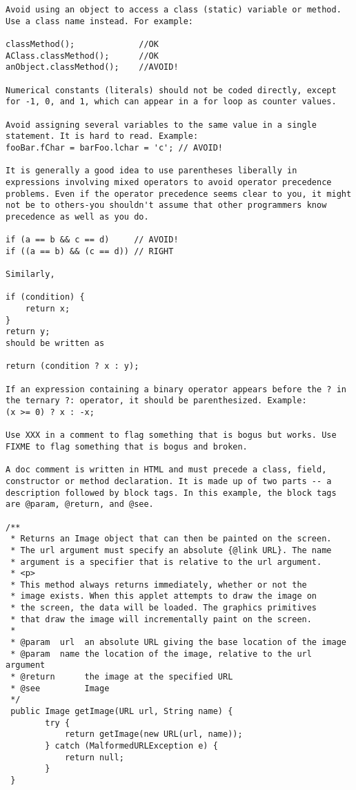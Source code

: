 \begin{lstlisting}
Avoid using an object to access a class (static) variable or method. Use a class name instead. For example:

classMethod();             //OK
AClass.classMethod();      //OK
anObject.classMethod();    //AVOID!

Numerical constants (literals) should not be coded directly, except for -1, 0, and 1, which can appear in a for loop as counter values.

Avoid assigning several variables to the same value in a single statement. It is hard to read. Example:
fooBar.fChar = barFoo.lchar = 'c'; // AVOID!

It is generally a good idea to use parentheses liberally in expressions involving mixed operators to avoid operator precedence problems. Even if the operator precedence seems clear to you, it might not be to others-you shouldn't assume that other programmers know precedence as well as you do.

if (a == b && c == d)     // AVOID!
if ((a == b) && (c == d)) // RIGHT

Similarly,

if (condition) {
    return x;
}
return y;
should be written as

return (condition ? x : y);

If an expression containing a binary operator appears before the ? in the ternary ?: operator, it should be parenthesized. Example:
(x >= 0) ? x : -x;

Use XXX in a comment to flag something that is bogus but works. Use FIXME to flag something that is bogus and broken.

A doc comment is written in HTML and must precede a class, field, constructor or method declaration. It is made up of two parts -- a description followed by block tags. In this example, the block tags are @param, @return, and @see.

/**
 * Returns an Image object that can then be painted on the screen. 
 * The url argument must specify an absolute {@link URL}. The name
 * argument is a specifier that is relative to the url argument. 
 * <p>
 * This method always returns immediately, whether or not the 
 * image exists. When this applet attempts to draw the image on
 * the screen, the data will be loaded. The graphics primitives 
 * that draw the image will incrementally paint on the screen. 
 *
 * @param  url  an absolute URL giving the base location of the image
 * @param  name the location of the image, relative to the url argument
 * @return      the image at the specified URL
 * @see         Image
 */
 public Image getImage(URL url, String name) {
        try {
            return getImage(new URL(url, name));
        } catch (MalformedURLException e) {
            return null;
        }
 }
 

\end{lstlisting}
